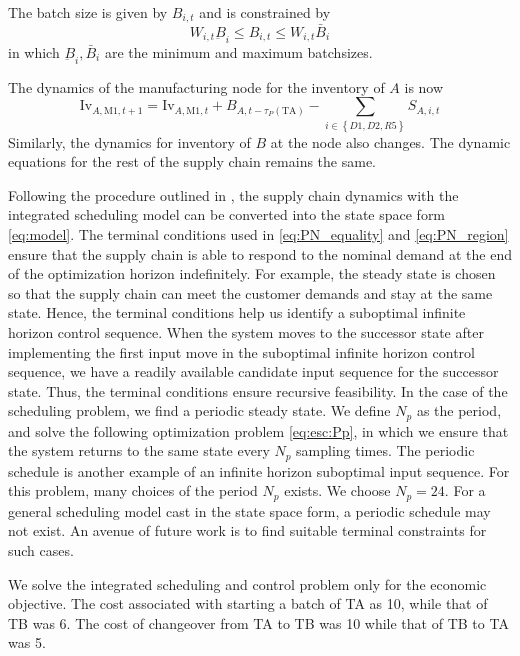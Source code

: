 \documentclass{elsarticle}
\newcommand{\set}[1]{\left\lbrace #1 \right\rbrace}
\newcommand{\Inv}{\textrm{Iv}}
\theoremstyle{definition}
\begin{document}
The batch size is given by $B_{i,t}$ and is constrained by
\begin{equation}
\label{eq:esc:bts}
W_{i,t}\underbar{B}_i \leq B_{i,t} \leq W_{i,t}\bar{B}_i
\end{equation}
 in which $\underbar{B}_i,\bar{B}_i$ are the minimum and maximum batchsizes. 
 
 The dynamics of the manufacturing node for the inventory of $A$ is now
 \begin{equation}
 \label{eq:esc:invam}
 \Inv_{A,\text{M1},t+1} = \Inv _{A,\text{M1},t} + B_{A,t-\tau_{P}(\text{TA})} - \sum_{i \in \set{D1,D2,R5}}S_{A, i,t}
 \end{equation}
 Similarly, the dynamics for inventory of $B$ at the node also
 changes. The dynamic equations for the rest of the supply chain
 remains the same.  
 
 Following the procedure outlined in
 \cite{subramanian:maravelias:rawlings:2012}, the supply chain
 dynamics with the integrated scheduling model can be converted into
 the state space form \eqref{eq:model}. 
The terminal conditions used in \eqref{eq:PN_equality} and
\eqref{eq:PN_region} ensure that the supply chain is able to respond
to the nominal demand at the end of the optimization horizon
indefinitely. For example, the steady state is chosen so that the
supply chain can meet the customer demands and stay at the same
state. Hence, the terminal conditions help us identify a suboptimal
infinite horizon control sequence. When the system moves to the
successor state after implementing the first input move in the
suboptimal infinite horizon control sequence, we have a readily
available candidate input sequence for the successor state. Thus, the
terminal conditions ensure recursive feasibility. In the
case of the scheduling problem, we find a periodic steady state. We
define $N_p$ as the period, and solve the following optimization
problem \eqref{eq:esc:Pp}, in which we ensure that the system returns
to the same state every $N_p$ sampling times. The periodic schedule is
another example of an infinite horizon suboptimal input sequence. For
this problem, many choices of the period $N_p$ exists. We choose
$N_p=24$. For a general scheduling model cast in the state space form,
a periodic schedule may not exist. An avenue of future work is to
find suitable terminal constraints for such cases.

 We solve the integrated scheduling and control problem only for the economic objective. The cost associated with starting a batch of TA as 10, while that of TB was 6. The cost of changeover from TA to TB was 10 while that of TB to TA was 5. 
 
\end{document}
